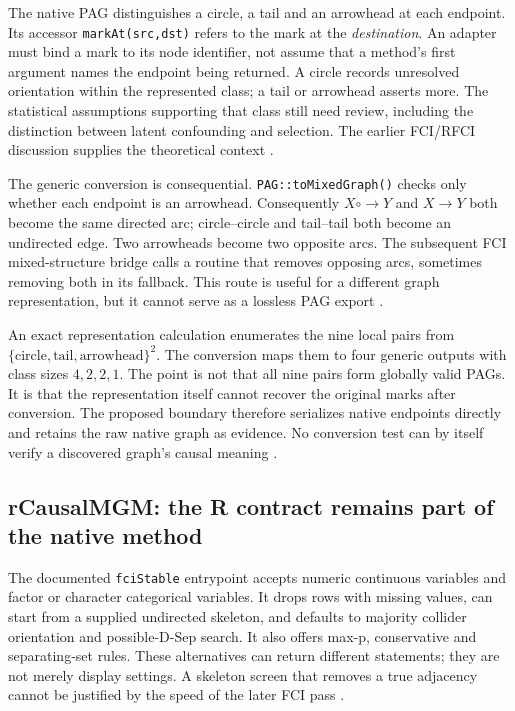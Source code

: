 The native PAG distinguishes a circle, a tail and an arrowhead at each
endpoint. Its accessor \texttt{markAt(src,dst)} refers to the mark at the
\emph{destination}. An adapter must bind a mark to its node identifier, not
assume that a method's first argument names the endpoint being returned. A
circle records unresolved orientation within the represented class; a tail
or arrowhead asserts more. The statistical assumptions supporting that class
still need review, including the distinction between latent confounding and
selection. The earlier FCI/RFCI discussion supplies the theoretical context
\citep{exec13_latentr_colombo2012}.

The generic conversion is consequential. \texttt{PAG::toMixedGraph()} checks
only whether each endpoint is an arrowhead. Consequently $X\mathbin{\circ\!\to}Y$
and $X\to Y$ both become the same directed arc; circle--circle and tail--tail
both become an undirected edge. Two arrowheads become two opposite arcs.
The subsequent FCI mixed-structure bridge calls a routine that removes
opposing arcs, sometimes removing both in its fallback. This route is useful
for a different graph representation, but it cannot serve as a lossless PAG
export \citep{exec14_native_agrum}.

An exact representation calculation enumerates the nine local pairs from
$\{\text{circle},\text{tail},\text{arrowhead}\}^2$. The conversion maps them to
four generic outputs with class sizes $4,2,2,1$. The point is not that all nine
pairs form globally valid PAGs. It is that the representation itself cannot
recover the original marks after conversion. The proposed boundary therefore
serializes native endpoints directly and retains the raw native graph as
evidence. No conversion test can by itself verify a discovered graph's causal
meaning \citep{exec14_native_oracle}.

\subsection{rCausalMGM: the R contract remains part of the native method}

The documented \texttt{fciStable} entrypoint accepts numeric continuous
variables and factor or character categorical variables. It drops rows with
missing values, can start from a supplied undirected skeleton, and defaults
to majority collider orientation and possible-D-Sep search. It also offers
max-p, conservative and separating-set rules. These alternatives can return
different statements; they are not merely display settings. A skeleton
screen that removes a true adjacency cannot be justified by the speed of the
later FCI pass \citep{exec14_native_rcmgm}.

